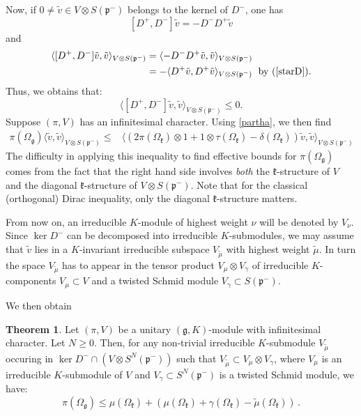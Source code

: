\documentclass{amsart}[draft,11pt]
\newcommand{\mg}{\mathfrak{g}}
\newcommand{\mk}{\mathfrak{k}}
\newcommand{\fg}{{\mathfrak{g}}}
\newcommand{\fk}{{\mathfrak{k}}}
\newcommand{\fp}{{\mathfrak{p}}}
\numberwithin{equation}{section}
\theoremstyle{definition}
\newtheorem{theorem}{Theorem}[section]
\begin{document}
Now, if $0\neq \tilde v\in V\otimes S(\fp^-)$ belongs to the kernel of $D^-$, one has 
$$[D^+,D^-]\tilde v=-D^-D^+\tilde v$$
and
\begin{align*}
\langle [D^+,D^-]\tilde v, \tilde v\rangle_{V\otimes S(\fp^-)}&=\langle -D^-D^+\tilde v,\tilde v\rangle_{V\otimes S(\fp^-)}\\
&=-\langle D^+\tilde v,D^+\tilde v\rangle_{V\otimes S(\fp^-)}\;\text{ by }(\ref{starD}).
\end{align*}
Thus, we obtains that:
\begin{equation}\label{Dirac-ineq}
\langle [D^+,D^-]\tilde v, \tilde v\rangle_{V\otimes S(\fp^-)}\leq 0.
\end{equation}
Suppose $(\pi,V)$ has an infinitesimal character. Using \eqref{partha}, we then find
\begin{align}\label{Dirac-ineq-3} 
\pi(\Omega_\fg)\langle \tilde v,\tilde v\rangle_{V\otimes S(\fp^-)}\leq  & \langle (2 \pi(\Omega_\fk)\otimes 1+ 1\otimes\tau(\Omega_\mathfrak{k})-
 \delta(\Omega_\mathfrak{k}))\tilde v,\tilde v\rangle_{V\otimes S(\fp^-)}
\end{align}
The difficulty in applying this inequality to find effective bounds for $\pi(\Omega_\fg)$ comes from the fact that the right hand side involves \emph{both} the $\fk$-structure of $V$ and the diagonal $\fk$-structure of $V\otimes S(\fp^-)$. Note that for the classical (orthogonal) Dirac inequality, only the diagonal $\fk$-structure matters.

From now on, an irreducible $K$-module of highest weight $\nu$ will be denoted by $V_\nu$. Since $\ker D^-$ can be decomposed into irreducible $K$-submodules,
we may assume that $\tilde{v}$ lies in a $K$-invariant irreducible 
subspace $V_{\tilde{\mu}}$ with highest weight $\tilde{\mu}$. 
In turn the space $V_{\tilde{\mu}}$ has to appear
in the tensor product $V_\mu \otimes V_\gamma$ of  irreducible $K$-components
$V_\mu \subset V$ and a twisted Schmid module $V_\gamma \subset S(\mathfrak{p}^-)$.

We then obtain
\begin{theorem} \label{inequality1}
Let $(\pi,V)$ be a unitary $(\fg,K)$-module with infinitesimal character. Let $N\geq 0$. 
Then, for any non-trivial irreducible $K$-submodule $V_{\tilde{\mu}}$ occuring in $\ker D^- \cap (V\otimes S^N(\fp^-))$ such that $V_{\tilde{\mu}} \subset V_\mu\otimes V_\gamma$, where $V_\mu$ is an irreducible $K$-submodule of $V$ and $V_\gamma\subset S^N(\mathfrak{p}^-)$ is a twisted Schmid module, we have:
\begin{equation}
    \label{general_inequality}
\pi(\Omega_\mg) \leq
\mu(\Omega_\mk)+(\mu(\Omega_\mk)+\gamma(\Omega_\mk)-\tilde{\mu}(\Omega_\mk))\,.
\end{equation}
\end{theorem}
\end{document}
